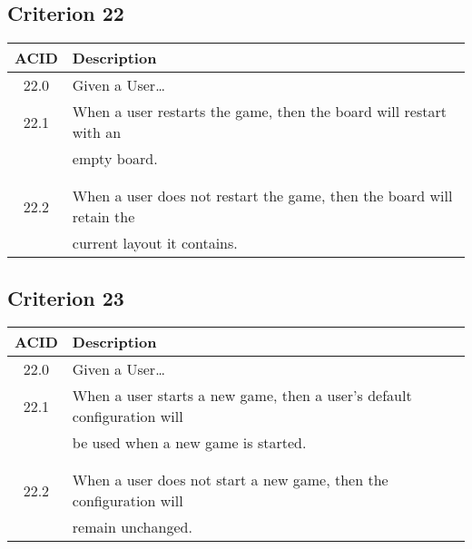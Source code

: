 \documentclass[11pt]{article}
\begin{document}
\subsection{Criterion 22}
\label{sec:orge0a2205}
\begin{center}
\begin{tabular}{|c|p{12.0cm}|}
ACID & Description\\
\hline
22.0 & Given a User\ldots{}\\
\hline
22.1 & When a user restarts the game, then the board will restart with an\\
 & empty board.\\
 & \\
 & \\
22.2 & When a user does not restart the game, then the board will retain the\\
 & current layout it contains.\\
\end{tabular}
\end{center}

\subsection{Criterion 23}
\label{sec:org11d6adf}
\begin{center}
\begin{tabular}{|c|p{12.0cm}|}
ACID & Description\\
\hline
22.0 & Given a User\ldots{}\\
\hline
22.1 & When a user starts a new game, then a user's default configuration will\\
 & be used when a new game is started.\\
 & \\
 & \\
22.2 & When a user does not start a new game, then the configuration will\\
 & remain unchanged.\\
\end{tabular}
\end{center}

\newpage
\end{document}
